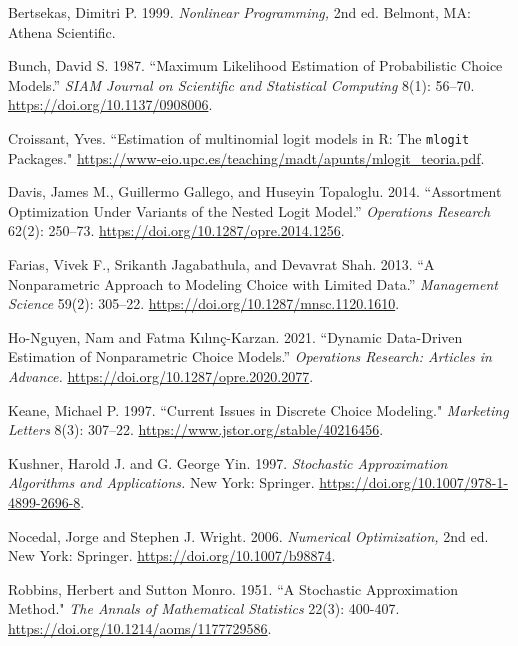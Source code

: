 \documentclass[preprint,12pt,authoryear]{elsarticle}
\begin{document}
\begin{thebibliography}{00}

Bertsekas, Dimitri P. 1999. \emph{Nonlinear Programming,} 2nd ed. Belmont, MA: Athena Scientific. 

Bunch, David S. 1987. ``Maximum Likelihood Estimation of Probabilistic Choice Models.'' \emph{SIAM Journal on Scientific and Statistical Computing} 8(1): 56--70. {\url{https://doi.org/10.1137/0908006}}. 

Croissant, Yves. ``Estimation of multinomial logit models in R: The \texttt{mlogit} Packages." {\url{https://www-eio.upc.es/teaching/madt/apunts/mlogit_teoria.pdf}}. 

Davis, James M.,  Guillermo Gallego, and Huseyin Topaloglu. 2014. ``Assortment Optimization Under Variants of the Nested Logit Model.'' \emph{Operations Research} 62(2): 250--73. {\url{https://doi.org/10.1287/opre.2014.1256}}. 

Farias, Vivek F., Srikanth Jagabathula, and Devavrat Shah. 2013. “A Nonparametric Approach to Modeling Choice with Limited Data.” \emph{Management Science} 59(2): 305--22. {\url{https://doi.org/10.1287/mnsc.1120.1610}}. 

Ho-Nguyen, Nam and Fatma Kılınç-Karzan. 2021. ``Dynamic Data-Driven Estimation of Nonparametric Choice Models.'' \emph{Operations Research: Articles in Advance.} {\url{https://doi.org/10.1287/opre.2020.2077}}.

Keane, Michael P. 1997. ``Current Issues in Discrete Choice Modeling." \emph{Marketing Letters} 8(3): 307--22. {\url{https://www.jstor.org/stable/40216456}}.

Kushner, Harold J. and G. George Yin. 1997. \emph{Stochastic Approximation Algorithms and Applications.} New York: Springer. {\url{https://doi.org/10.1007/978-1-4899-2696-8}}.

Nocedal, Jorge and Stephen J. Wright. 2006. \emph{Numerical Optimization,} 2nd ed. New York: Springer. {\url{https://doi.org/10.1007/b98874}}. 

Robbins, Herbert and Sutton Monro. 1951. ``A Stochastic Approximation Method." \emph{The Annals of Mathematical Statistics} 22(3): 400-407. {\url{https://doi.org/10.1214/aoms/1177729586}}. 


\end{thebibliography}
\end{document}
